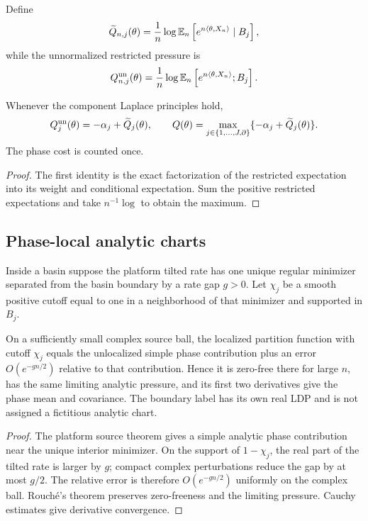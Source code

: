 Define
\[
 \widetilde Q_{n,j}(\theta)
 ={1\over n}\log
 \mathbb E_n\left[e^{n\langle\theta,X_n\rangle}
                  \mid B_j\right],
\]
while the unnormalized restricted pressure is
\[
 Q_{n,j}^{\rm un}(\theta)
 ={1\over n}\log
 \mathbb E_n\left[e^{n\langle\theta,X_n\rangle};B_j\right].
\]

\begin{proposition}
\label{prop:r13-d1-pressure}
Whenever the component Laplace principles hold,
\[
 Q_j^{\rm un}(\theta)=-\alpha_j+\widetilde Q_j(\theta),
 \qquad
 Q(\theta)=
 \max_{j\in\{1,\ldots,J,\partial\}}
 \{-\alpha_j+\widetilde Q_j(\theta)\}.
\]
The phase cost is counted once.
\end{proposition}

\begin{proof}
The first identity is the exact factorization of the restricted expectation
into its weight and conditional expectation.  Sum the positive restricted
expectations and take $n^{-1}\log$ to obtain the maximum.
\end{proof}

\subsection{Phase-local analytic charts}

Inside a basin suppose the platform tilted rate has one unique regular
minimizer separated from the basin boundary by a rate gap $g>0$.  Let
$\chi_j$ be a smooth positive cutoff equal to one in a neighborhood of that
minimizer and supported in $B_j$.

\begin{theorem}
\label{thm:r13-d1-local}
On a sufficiently small complex source ball, the localized partition
function with cutoff $\chi_j$ equals the unlocalized simple phase contribution
plus an error $O(e^{-gn/2})$ relative to that contribution.  Hence it is
zero-free there for large $n$, has the same limiting analytic pressure, and
its first two derivatives give the phase mean and covariance.  The boundary
label has its own real LDP and is not assigned a fictitious analytic chart.
\end{theorem}

\begin{proof}
The platform source theorem gives a simple analytic phase contribution near
the unique interior minimizer.  On the support of $1-\chi_j$, the real part of
the tilted rate is larger by $g$; compact complex perturbations reduce the gap
by at most $g/2$.  The relative error is therefore $O(e^{-gn/2})$ uniformly on
the complex ball.  Rouché's theorem preserves zero-freeness and the limiting
pressure.  Cauchy estimates give derivative convergence.
\end{proof}

